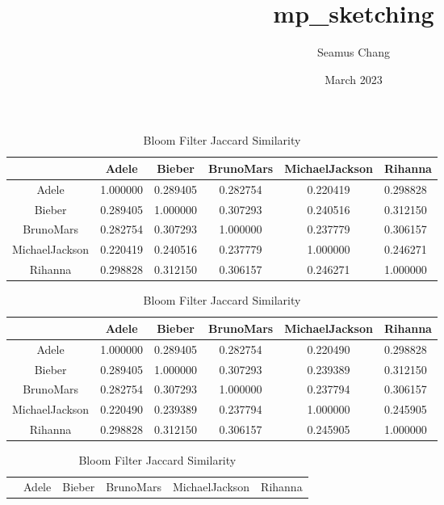 \documentclass{article}
\title{mp_sketching}
\author{Seamus Chang}
\date{March 2023}
\begin{document}
\begin{table}[ht]
\centering
\begin{subtable}{\textwidth}
\centering
\caption{Raw Data Jaccard Similarity}
\vspace{0.25cm}
\begin{tabular}{|c|c|c|c|c|p{1.8cm}|}
\hline
{} &     Adele &    Bieber &  BrunoMars &  MichaelJackson &   Rihanna \\
\hline
Adele          &  1.000000 &  0.289405 &   0.282754 &        0.220419 &  0.298828 \\
Bieber         &  0.289405 &  1.000000 &   0.307293 &        0.240516 &  0.312150 \\
BrunoMars      &  0.282754 &  0.307293 &   1.000000 &        0.237779 &  0.306157 \\
MichaelJackson &  0.220419 &  0.240516 &   0.237779 &        1.000000 &  0.246271 \\
Rihanna        &  0.298828 &  0.312150 &   0.306157 &        0.246271 &  1.000000 \\
\hline
\end{tabular}
\end{subtable}
\begin{subtable}{\textwidth}
\centering
\caption{MinHash Jaccard Similarity}
\vspace{0.25cm}
\begin{tabular}{|c|c|c|c|c|p{1.8cm}|}
\hline
{} &     Adele &    Bieber &  BrunoMars &  MichaelJackson &   Rihanna \\
\hline
Adele          &  1.000000 &  0.289405 &   0.282754 &        0.220490 &  0.298828 \\
Bieber         &  0.289405 &  1.000000 &   0.307293 &        0.239389 &  0.312150 \\
BrunoMars      &  0.282754 &  0.307293 &   1.000000 &        0.237794 &  0.306157 \\
MichaelJackson &  0.220490 &  0.239389 &   0.237794 &        1.000000 &  0.245905 \\
Rihanna        &  0.298828 &  0.312150 &   0.306157 &        0.245905 &  1.000000 \\
\hline
\end{tabular}
\end{subtable}
\begin{subtable}{\textwidth}
\centering
\caption{Bloom Filter Jaccard Similarity}
\vspace{0.25cm}
\begin{tabular}{|c|c|c|c|c|p{1.8cm}|}
\hline
{} &     Adele &    Bieber &  BrunoMars &  MichaelJackson &   Rihanna \\

\end{tabular}
\end{subtable}
\end{table}
\end{document}
